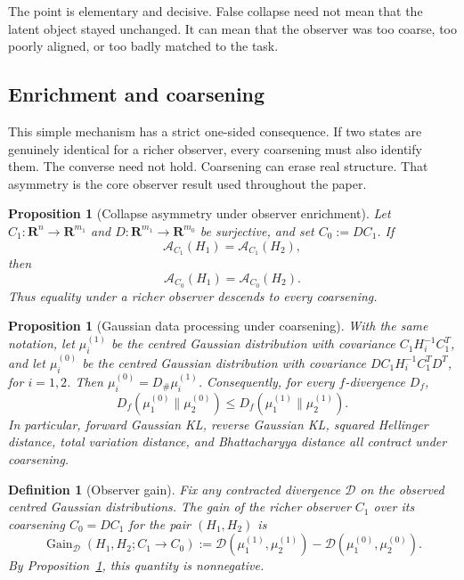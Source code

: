\documentclass[11pt,a4paper]{article}
\numberwithin{equation}{section}
\newcommand{\R}{\mathbf R}
\newcommand{\Aobs}{\mathcal A}
\theoremstyle{thmcompact}
\newtheorem{proposition}[theorem]{Proposition}
\newtheorem{definition}[theorem]{Definition}
\theoremstyle{remark}
\begin{document}
The point is elementary and decisive. False collapse need not mean that the latent object stayed unchanged. It can mean that the observer was too coarse, too poorly aligned, or too badly matched to the task.

\subsection{Enrichment and coarsening}

This simple mechanism has a strict one-sided consequence. If two states are genuinely identical for a richer observer, every coarsening must also identify them. The converse need not hold. Coarsening can erase real structure. That asymmetry is the core observer result used throughout the paper.

\begin{proposition}[Collapse asymmetry under observer enrichment]
\label{prop:collapse-asymmetry}
Let \(C_1:\R^n\to\R^{m_1}\) and \(D:\R^{m_1}\to\R^{m_0}\) be surjective, and set \(C_0:=DC_1\). If
\[
\Aobs_{C_1}(H_1)=\Aobs_{C_1}(H_2),
\]
then
\[
\Aobs_{C_0}(H_1)=\Aobs_{C_0}(H_2).
\]
Thus equality under a richer observer descends to every coarsening.
\end{proposition}

\begin{proposition}[Gaussian data processing under coarsening]
\label{prop:gaussian-dp}
With the same notation, let \(\mu_i^{(1)}\) be the centred Gaussian distribution with covariance \(C_1H_i^{-1}C_1^T\), and let \(\mu_i^{(0)}\) be the centred Gaussian distribution with covariance \(DC_1H_i^{-1}C_1^TD^T\), for \(i=1,2\). Then \(\mu_i^{(0)}=D_\#\mu_i^{(1)}\). Consequently, for every \(f\)-divergence \(D_f\),
\[
D_f(\mu_1^{(0)}\|\mu_2^{(0)})\le D_f(\mu_1^{(1)}\|\mu_2^{(1)}).
\]
In particular, forward Gaussian KL, reverse Gaussian KL, squared Hellinger distance, total variation distance, and Bhattacharyya distance all contract under coarsening.
\end{proposition}

\begin{definition}[Observer gain]
\label{def:observer-gain}
Fix any contracted divergence \(\mathcal D\) on the observed centred Gaussian distributions. The gain of the richer observer \(C_1\) over its coarsening \(C_0=DC_1\) for the pair \((H_1,H_2)\) is
\[
\operatorname{Gain}_{\mathcal D}(H_1,H_2;C_1\to C_0)
:=
\mathcal D(\mu_1^{(1)},\mu_2^{(1)})-\mathcal D(\mu_1^{(0)},\mu_2^{(0)}).
\]
By Proposition~\ref{prop:gaussian-dp}, this quantity is nonnegative.
\end{definition}
\end{document}

